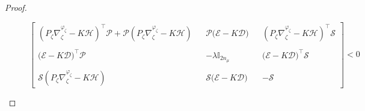 \begin{proof}
\begin{figure}
{\begin{equation}\label{ali_thm_e5}
\begin{bmatrix}
\left( P_{\zeta} \nabla^{\varphi_{\zeta}}_{\zeta} - K  \mathcal{H} \right)^{\top} \mathcal{P} 
+ \mathcal{P} \left( P_{\zeta} \nabla^{\varphi_{\zeta}}_{\zeta} - K  \mathcal{H} \right)
&&
\mathcal{P} \Big( \mathcal{E} - K  \mathcal{D}\Big) && \left( P_{\zeta} \nabla^{\varphi_{\zeta}}_{\zeta} - K  \mathcal{H} \right)^{\top} \mathcal{S}
\\~\\
\Big( \mathcal{E} - K  \mathcal{D}\Big)^{\top} \mathcal{P} && 
- \lambda \mathbb{I}_{2n_{\mu}} && \Big( \mathcal{E} - K  \mathcal{D}\Big)^{\top} \mathcal{S}
\\~\\
\mathcal{S} \left( P_{\zeta} \nabla^{\varphi_{\zeta}}_{\zeta} - K  \mathcal{H} \right) && 
\mathcal{S} \Big( \mathcal{E} - K  \mathcal{D}\Big)&& - \mathcal{S}
\end{bmatrix} 
< 0
\end{equation}
}






\end{figure}
\end{proof}
